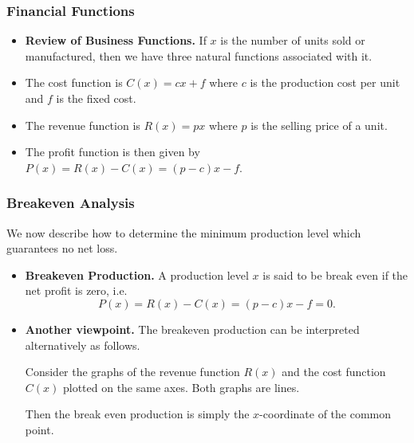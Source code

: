 \begin{frame}%
  \frametitle{Financial Functions}
 \begin{itemize}%
\item {\bf Review of Business Functions.} If $x$ is the number of units sold or manufactured, then 
 we have three natural functions associated with it.
\item The cost function is $C(x)=cx+f$ where $c$ is the production cost per unit 
 and $f$ is the fixed 
 cost.
\item The revenue function is $R(x) = px$ where $p$ is the selling price of a unit.
 \item
 The profit function is then given by $\displaystyle P(x)=R(x)-C(x) =(p-c)x -f $.
\end{itemize}

\end{frame}


\begin{frame}%
  \frametitle{Breakeven Analysis}
 
  \alert{We now describe how to determine the minimum production level which guarantees no 
  net loss.}
  
    \begin{itemize}%
    \item {\bf Breakeven Production.}
    A production level $x$ is said to be break even if the net profit is zero, i.e.
    $$P(x) = R(x) - C(x) = (p-c)x -f = 0.$$
    
    	
      
      
    \item {\bf Another viewpoint.}
    The breakeven production can be interpreted alternatively as follows.
    
    Consider the graphs of the revenue function $R(x)$ and the cost function $C(x)$ plotted 
    on the same axes. Both graphs are lines.
    
    Then the break even production is simply the $x$-coordinate of the common point. 
    \end{itemize}

\end{frame}

